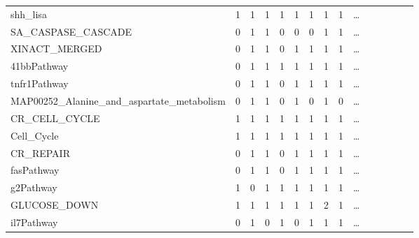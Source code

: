 \documentclass{scrartcl}
\numberwithin{figure}{section}
\numberwithin{table}{section}
\begin{document}
\begin{table}[h!]
\begin{tabular}{lllllllllllllll}
    shh\_lisa                                        & 1            & 1           & 1               & 1          & 1            & 1            & 1            & 1 & \dots \\
    SA\_CASPASE\_CASCADE                             & 0            & 1           & 1               & 0          & 0            & 0            & 1            & 1 & \dots \\
    XINACT\_MERGED                                   & 0            & 1           & 1               & 0          & 1            & 1            & 1            & 1 & \dots \\
    41bbPathway                                      & 0            & 1           & 1               & 1          & 1            & 1            & 1            & 1 & \dots \\
    tnfr1Pathway                                     & 0            & 1           & 1               & 0          & 1            & 1            & 1            & 1 & \dots \\
    MAP00252\_Alanine\_and\_aspartate\_metabolism    & 0            & 1           & 1               & 0          & 1            & 0            & 1            & 0 & \dots \\
    CR\_CELL\_CYCLE                                  & 1            & 1           & 1               & 1          & 1            & 1            & 1            & 1 & \dots \\
    Cell\_Cycle                                      & 1            & 1           & 1               & 1          & 1            & 1            & 1            & 1 & \dots \\
    CR\_REPAIR                                       & 0            & 1           & 1               & 0          & 1            & 1            & 1            & 1 & \dots \\
    fasPathway                                       & 0            & 1           & 1               & 0          & 1            & 1            & 1            & 1 & \dots \\
    g2Pathway                                        & 1            & 0           & 1               & 1          & 1            & 1            & 1            & 1 & \dots \\
    GLUCOSE\_DOWN                                    & 1            & 1           & 1               & 1          & 1            & 1            & 2            & 1 & \dots \\
    il7Pathway                                       & 0            & 1           & 0               & 1          & 0            & 1            & 1            & 1 & \dots \\

\end{tabular}
\end{table}
\end{document}
